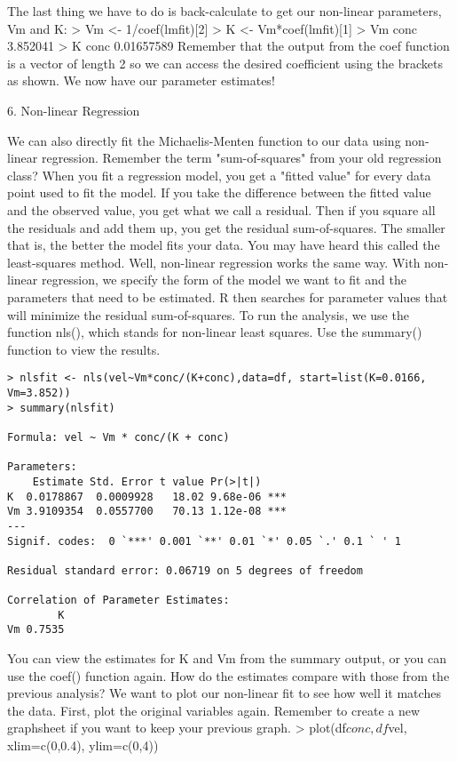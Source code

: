 {The last thing we have to do is back-calculate to get our non-linear parameters, Vm and K: 
> Vm <- 1/coef(lmfit)[2]
> K <- Vm*coef(lmfit)[1]
> Vm
    conc 
3.852041 
> K
      conc 
0.01657589 
Remember that the output from the coef function is a vector of length 2 so we can access the desired coefficient using the brackets as shown. We now have our parameter estimates! 

6. Non-linear Regression


We can also directly fit the Michaelis-Menten function to our data using non-linear regression. Remember the term "sum-of-squares" from your old regression class? When you fit a regression model, you get a "fitted value" for every data point used to fit the model. If you take the difference between the fitted value and the observed value, you get what we call a residual. Then if you square all the residuals and add them up, you get the residual sum-of-squares. The smaller that is, the better the model fits your data. You may have heard this called the least-squares method. Well, non-linear regression works the same way. With non-linear regression, we specify the form of the model we want to fit and the parameters that need to be estimated. R then searches for parameter values that will minimize the residual sum-of-squares. 
To run the analysis, we use the function nls(), which stands for non-linear least squares. Use the summary() function to view the results. 
\begin{framed}
\begin{verbatim}
> nlsfit <- nls(vel~Vm*conc/(K+conc),data=df, start=list(K=0.0166, Vm=3.852))
> summary(nlsfit)

Formula: vel ~ Vm * conc/(K + conc)

Parameters:
    Estimate Std. Error t value Pr(>|t|)    
K  0.0178867  0.0009928   18.02 9.68e-06 ***
Vm 3.9109354  0.0557700   70.13 1.12e-08 ***
---
Signif. codes:  0 `***' 0.001 `**' 0.01 `*' 0.05 `.' 0.1 ` ' 1 

Residual standard error: 0.06719 on 5 degrees of freedom

Correlation of Parameter Estimates:
        K
Vm 0.7535 
\end{verbatim}
\end{framed}

You can view the estimates for K and Vm from the summary output, or you can use the coef() function again. How do the estimates compare with those from the previous analysis? We want to plot our non-linear fit to see how well it matches the data. First, plot the original variables again. Remember to create a new graphsheet if you want to keep your previous graph. 
> plot(df$conc, df$vel, xlim=c(0,0.4), ylim=c(0,4))


}
